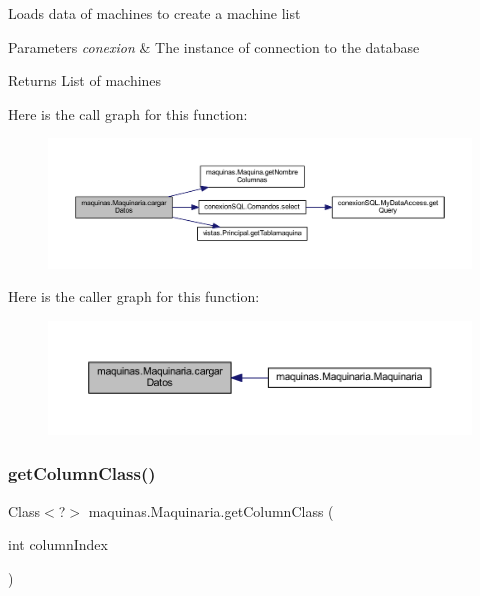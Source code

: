 Loads data of machines to create a machine list 
\begin{DoxyParams}{Parameters}
{\em conexion} & The instance of connection to the database \\
\hline
\end{DoxyParams}
\begin{DoxyReturn}{Returns}
List of machines 
\end{DoxyReturn}
Here is the call graph for this function\+:
\nopagebreak
\begin{figure}[H]
\begin{center}
\leavevmode
\includegraphics[width=350pt]{classmaquinas_1_1_maquinaria_a8c8ade68894e4e32e50a0130d482bc5e_cgraph}
\end{center}
\end{figure}
Here is the caller graph for this function\+:
\nopagebreak
\begin{figure}[H]
\begin{center}
\leavevmode
\includegraphics[width=350pt]{classmaquinas_1_1_maquinaria_a8c8ade68894e4e32e50a0130d482bc5e_icgraph}
\end{center}
\end{figure}
\mbox{\label{classmaquinas_1_1_maquinaria_ae792351e004fa5f3d10900e33f10186d}} 
\subsubsection{\texorpdfstring{get\+Column\+Class()}{getColumnClass()}}
{\footnotesize\ttfamily Class$<$?$>$ maquinas.\+Maquinaria.\+get\+Column\+Class (\begin{DoxyParamCaption}\item[{int}]{column\+Index }\end{DoxyParamCaption})}

